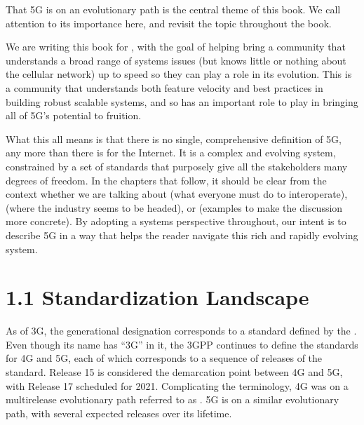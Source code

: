 \documentclass[a4paper,11pt,english]{sphinxmanual}
\begin{document}
\begin{sphinxShadowBox}

\sphinxAtStartPar
That 5G is on an evolutionary path is the central theme of
this book.  We call attention to its importance here, and
revisit the topic throughout the book.

\sphinxAtStartPar
We are writing this book for , with the
goal of helping bring a community that understands a broad
range of systems issues (but knows little or nothing about the
cellular network) up to speed so they can play a role in its
evolution. This is a community that understands both feature
velocity and best practices in building robust scalable
systems, and so has an important role to play in bringing all
of 5G’s potential to fruition.
\end{sphinxShadowBox}

\sphinxAtStartPar
What this all means is that there is no single, comprehensive definition
of 5G, any more than there is for the Internet. It is a complex and
evolving system, constrained by a set of standards that purposely give
all the stakeholders many degrees of freedom. In the chapters that
follow, it should be clear from the context whether we are talking about
 (what everyone must do to interoperate),  (where
the industry seems to be headed), or 
(examples to make the discussion more concrete). By adopting a systems
perspective throughout, our intent is to describe 5G in a way that
helps the reader navigate this rich and rapidly evolving system.


\section{1.1 Standardization Landscape}
\label{\detokenize{intro:standardization-landscape}}
\sphinxAtStartPar
As of 3G, the generational designation corresponds to a standard defined
by the . Even though its name
has “3G” in it, the 3GPP continues to define the standards for 4G and 5G,
each of which corresponds to a sequence of releases of the standard.
Release 15 is considered the demarcation point between 4G and 5G, with
Release 17 scheduled for 2021. Complicating the terminology, 4G
was on a multi\sphinxhyphen{}release evolutionary path referred to as . 5G is on a similar evolutionary path, with several
expected releases over its lifetime.
\end{document}
